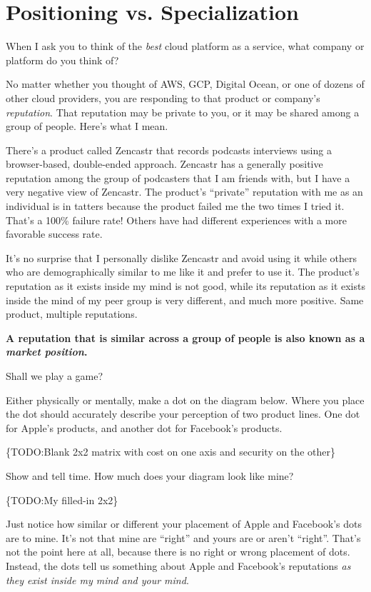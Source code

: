 \chapter{Positioning vs. Specialization}

When I ask you to think of the \emph{best} cloud platform as a service, what company or platform do you think of?

No matter whether you thought of AWS, GCP, Digital Ocean, or one of dozens of other cloud providers, you are responding to that product or company's \emph{reputation}. That reputation may be private to you, or it may be shared among a group of people. Here's what I mean.

There's a product called Zencastr that records podcasts interviews using a browser-based, double-ended approach. Zencastr has a generally positive reputation among the group of podcasters that I am friends with, but I have a very negative view of Zencastr. The product's ``private'' reputation with me as an individual is in tatters because the product failed me the two times I tried it. That's a 100\% failure rate! Others have had different experiences with a more favorable success rate.

It's no surprise that I personally dislike Zencastr and avoid using it while others who are demographically similar to me like it and prefer to use it. The product's reputation as it exists inside my mind is not good, while its reputation as it exists inside the mind of my peer group is very different, and much more positive. Same product, multiple reputations.

\textbf{A reputation that is similar across a group of people is also known as a \emph{market position}.}

Shall we play a game?

Either physically or mentally, make a dot on the diagram below. Where you place the dot should accurately describe your perception of two product lines. One dot for Apple's products, and another dot for Facebook's products.

\{TODO:Blank 2x2 matrix with cost on one axis and security on the other\}

Show and tell time. How much does your diagram look like mine?

\{TODO:My filled-in 2x2\}

Just notice how similar or different your placement of Apple and Facebook's dots are to mine. It's not that mine are ``right'' and yours are or aren't ``right''. That's not the point here at all, because there is no right or wrong placement of dots. Instead, the dots tell us something about Apple and Facebook's reputations \emph{as they exist inside my mind and your mind}.

